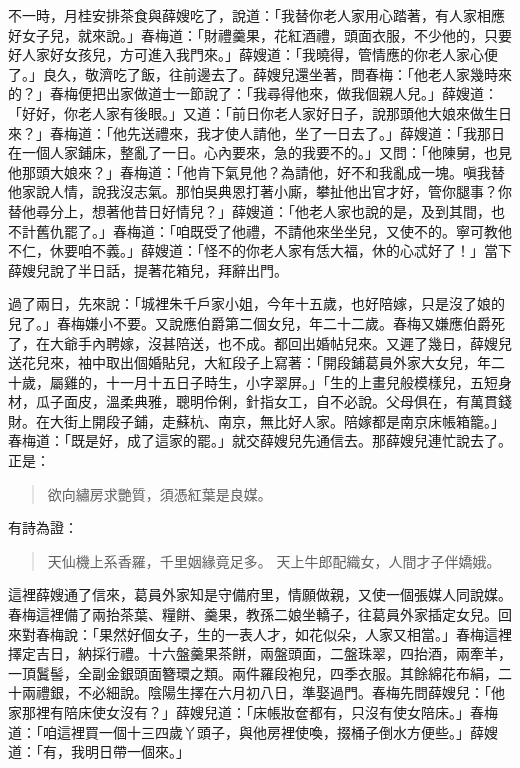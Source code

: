 不一時，月桂安排茶食與薛嫂吃了，說道：「我替你老人家用心踏著，有人家相應好女子兒，就來說。」春梅道：「財禮羹果，花紅酒禮，頭面衣服，不少他的，只要好人家好女孩兒，方可進入我門來。」薛嫂道：「我曉得，管情應的你老人家心便了。」良久，敬濟吃了飯，往前邊去了。薛嫂兒還坐著，問春梅：「他老人家幾時來的？」春梅便把出家做道士一節說了：「我尋得他來，做我個親人兒。」薛嫂道：「好好，你老人家有後眼。」又道：「前日你老人家好日子，說那頭他大娘來做生日來？」春梅道：「他先送禮來，我才使人請他，坐了一日去了。」薛嫂道：「我那日在一個人家鋪床，整亂了一日。心內要來，急的我要不的。」又問：「他陳舅，也見他那頭大娘來？」春梅道：「他肯下氣見他？為請他，好不和我亂成一塊。嗔我替他家說人情，說我沒志氣。那怕吳典恩打著小廝，攀扯他出官才好，管你腿事？你替他尋分上，想著他昔日好情兒？」薛嫂道：「他老人家也說的是，及到其間，也不計舊仇罷了。」春梅道：「咱既受了他禮，不請他來坐坐兒，又使不的。寧可教他不仁，休要咱不義。」薛嫂道：「怪不的你老人家有恁大福，休的心忒好了！」當下薛嫂兒說了半日話，提著花箱兒，拜辭出門。

過了兩日，先來說：「城裡朱千戶家小姐，今年十五歲，也好陪嫁，只是沒了娘的兒了。」春梅嫌小不要。又說應伯爵第二個女兒，年二十二歲。春梅又嫌應伯爵死了，在大爺手內聘嫁，沒甚陪送，也不成。都回出婚帖兒來。又遲了幾日，薛嫂兒送花兒來，袖中取出個婚貼兒，大紅段子上寫著：「開段鋪葛員外家大女兒，年二十歲，屬雞的，十一月十五日子時生，小字翠屏。」「生的上畫兒般模樣兒，五短身材，瓜子面皮，溫柔典雅，聰明伶俐，針指女工，自不必說。父母俱在，有萬貫錢財。在大街上開段子鋪，走蘇杭、南京，無比好人家。陪嫁都是南京床帳箱籠。」春梅道：「既是好，成了這家的罷。」就交薛嫂兒先通信去。那薛嫂兒連忙說去了。正是：
\begin{quote}
欲向繡房求艷質，須憑紅葉是良媒。
\end{quote}
有詩為證：
\begin{quote}
天仙機上系香羅，千里姻緣竟足多。
天上牛郎配織女，人間才子伴嬌娥。
\end{quote}

這裡薛嫂通了信來，葛員外家知是守備府里，情願做親，又使一個張媒人同說媒。春梅這裡備了兩抬茶葉、糧餅、羹果，教孫二娘坐轎子，往葛員外家插定女兒。回來對春梅說：「果然好個女子，生的一表人才，如花似朵，人家又相當。」春梅這裡擇定吉日，納採行禮。十六盤羹果茶餅，兩盤頭面，二盤珠翠，四抬酒，兩牽羊，一頂鬒髻，全副金銀頭面簪環之類。兩件羅段袍兒，四季衣服。其餘綿花布絹，二十兩禮銀，不必細說。陰陽生擇在六月初八日，準娶過門。春梅先問薛嫂兒：「他家那裡有陪床使女沒有？」薛嫂兒道：「床帳妝奩都有，只沒有使女陪床。」春梅道：「咱這裡買一個十三四歲丫頭子，與他房裡使喚，掇桶子倒水方便些。」薛嫂道：「有，我明日帶一個來。」

